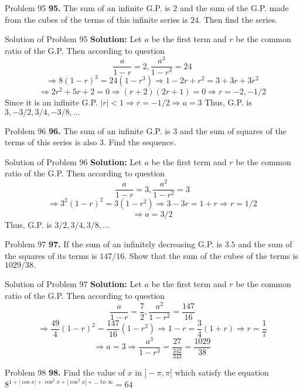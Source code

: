 \documentclass[aspectratio=1610,8pt]{beamer}
\begin{document}
\begin{frame}{Problem 95}
  \textbf{95.} The sum of an infinite G.P. is $2$ and the sum of the G.P. made from the cubes of the terms of this infinite series
  is $24.$ Then find the series.
\end{frame}
\begin{frame}{Solution of Problem 95}
  \textbf{Solution:} Let $a$ be the first term and $r$ be the common ratio of the G.P. Then according to question
  $$\frac{a}{1 - r} = 2, \frac{a^3}{1 - r^3} = 24$$
  $$\Rightarrow 8(1 - r)^3 = 24(1 - r^3)\Rightarrow 1 - 2r + r^2 = 3 + 3r + 3r^2$$
  $$\Rightarrow 2r^2 + 5r + 2 = 0 \Rightarrow (r + 2)(2r + 1) = 0 \Rightarrow r = -2, -1/2$$
  Since it is an infinite G.P. $|r| < 1 \Rightarrow r = -1/2 \Rightarrow a = 3$
  \linebreak\linebreak
  Thus, G.P. is $3, -3/2, 3/4, -3/8, \ldots$
\end{frame}
\begin{frame}{Problem 96}
  \textbf{96.} The sum of an infinite G.P. is $3$ and the sum of squares of the terms of this series is also $3.$ Find the sequence.
\end{frame}
\begin{frame}{Solution of Problem 96}
  \textbf{Solution:} Let $a$ be the first term and $r$ be the common ratio of the G.P. Then according to question
  $$\frac{a}{1 - r} = 3, \frac{a^2}{1 - r^2} = 3$$
  $$\Rightarrow 3^2(1 - r)^2 = 3(1 - r^2) \Rightarrow 3 -3r = 1 + r \Rightarrow r = 1/2$$
  $$\Rightarrow a = 3/2$$
  Thus, G.P. is $3/2, 3/4, 3/8, \ldots $
\end{frame}
\begin{frame}{Problem 97}
  \textbf{97.} If the sum of an infinitely decreasing G.P. is $3.5$ and the sum of the squares of its terms is $147/16.$ Show that
  the sum of the cubes of the terms is $1029/38.$
\end{frame}
\begin{frame}{Solution of Problem 97}
  \textbf{Solution:} Let $a$ be the first term and $r$ be the common ratio of the G.P. Then according to question
  $$\frac{a}{1 - r} = \frac{7}{2}, \frac{a^2}{1 - r^2} = \frac{147}{16}$$
  $$\Rightarrow \frac{49}{4}(1 - r)^2 = \frac{147}{16}(1 - r^2) \Rightarrow 1 - r = \frac{3}{4}(1 + r) \Rightarrow r =
  \frac{1}{7}$$
  $$\Rightarrow a = 3 \Rightarrow \frac{a^3}{1 - r^3} = \frac{27}{\frac{342}{343}} = \frac{1029}{38}$$
\end{frame}
\begin{frame}{Problem 98}
  \textbf{98.} Find the value of $x$ in $]-\pi, \pi[$ which satisfy the equation $8^{1 + |\cos x| + \cos^2 x + |\cos^3 x| + \ldots
        \text{~to~}\infty} = 64$
\end{frame}
\end{document}
